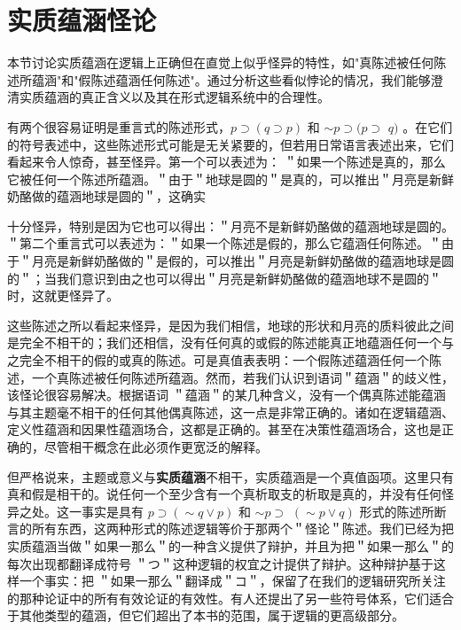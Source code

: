 \section{实质蕴涵怪论}

\begin{logicbox}[title=引言]
本节讨论实质蕴涵在逻辑上正确但在直觉上似乎怪异的特性，如"真陈述被任何陈述所蕴涵"和"假陈述蕴涵任何陈述"。通过分析这些看似悖论的情况，我们能够澄清实质蕴涵的真正含义以及其在形式逻辑系统中的合理性。
\end{logicbox}

有两个很容易证明是重言式的陈述形式，$p \supset(q \supset p)$ 和 $\sim p \supset(p \supset$ $q)$ 。在它们的符号表述中，这些陈述形式可能是无关紧要的，但若用日常语言表述出来，它们看起来令人惊奇，甚至怪异。第一个可以表述为： ＂如果一个陈述是真的，那么它被任何一个陈述所蕴涵。＂由于＂地球是圆的＂是真的，可以推出＂月亮是新鲜奶酪做的蕴涵地球是圆的＂，这确实

十分怪异，特别是因为它也可以得出：＂月亮不是新鲜奶酪做的蕴涵地球是圆的。＂第二个重言式可以表述为：＂如果一个陈述是假的，那么它蕴涵任何陈述。＂由于＂月亮是新鲜奶酪做的＂是假的，可以推出＂月亮是新鲜奶酪做的蕴涵地球是圆的＂；当我们意识到由之也可以得出＂月亮是新鲜奶酪做的蕴涵地球不是圆的＂时，这就更怪异了。

这些陈述之所以看起来怪异，是因为我们相信，地球的形状和月亮的质料彼此之间是完全不相干的；我们还相信，没有任何真的或假的陈述能真正地蕴涵任何一个与之完全不相干的假的或真的陈述。可是真值表表明：一个假陈述蕴涵任何一个陈述，一个真陈述被任何陈述所蕴涵。然而，若我们认识到语词＂蕴涵＂的歧义性，该怪论很容易解决。根据语词 ＂蕴涵＂的某几种含义，没有一个偶真陈述能蕴涵与其主题毫不相干的任何其他偶真陈述，这一点是非常正确的。诸如在逻辑蕴涵、定义性蕴涵和因果性蕴涵场合，这都是正确的。甚至在决策性蕴涵场合，这也是正确的，尽管相干概念在此必须作更宽泛的解释。

但严格说来，主题或意义与\textbf{实质蕴涵}不相干，实质蕴涵是一个真值函项。这里只有真和假是相干的。说任何一个至少含有一个真析取支的析取是真的，并没有任何怪异之处。这一事实是具有 $p \supset(\sim q \vee p)$ 和 $\sim p \supset$ $(\sim p \vee q)$ 形式的陈述所断言的所有东西，这两种形式的陈述逻辑等价于那两个＂怪论＂陈述。我们已经为把实质蕴涵当做＂如果一那么＂的一种含义提供了辩护，并且为把＂如果一那么＂的每次出现都翻译成符号 ＂つ＂这种逻辑的权宜之计提供了辩护。这种辩护基于这样一个事实：把 ＂如果一那么＂翻译成＂コ＂，保留了在我们的逻辑研究所关注的那种论证中的所有有效论证的有效性。有人还提出了另一些符号体系，它们适合于其他类型的蕴涵，但它们超出了本书的范围，属于逻辑的更高级部分。

